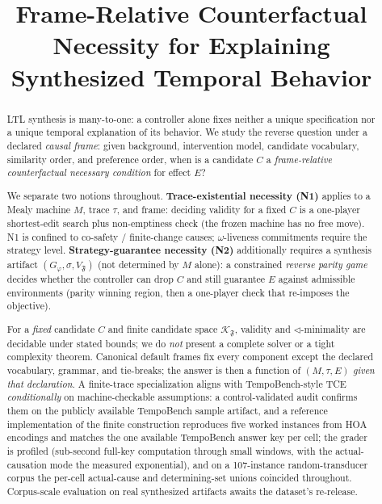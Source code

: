 \documentclass[11pt]{article}
\title{Frame-Relative Counterfactual Necessity for Explaining Synthesized
Temporal Behavior}
\author{}
\date{}
\theoremstyle{remark}
\newcommand{\Frame}{\mathfrak{F}}
\begin{document}
\maketitle

\begin{abstract}
LTL synthesis is many-to-one: a controller alone fixes neither a unique
specification nor a unique temporal explanation of its behavior. We study the
reverse question under a declared \emph{causal frame}: given background,
intervention model, candidate vocabulary, similarity order, and preference order,
when is a candidate \(C\) a \emph{frame-relative counterfactual necessary
condition} for effect \(E\)?

We separate two notions throughout. \textbf{Trace-existential necessity (N1)}
applies to a Mealy machine \(M\), trace \(\tau\), and frame: deciding validity
for a fixed \(C\) is a one-player shortest-edit search plus non-emptiness check
(the frozen machine has no free move). N1 is confined to co-safety / finite-change
causes; \(\omega\)-liveness commitments require the strategy level. \textbf{Strategy-guarantee
necessity (N2)} additionally requires a synthesis artifact \((G_\varphi,\sigma,V_{\Frame})\)
(not determined by \(M\) alone): a constrained \emph{reverse parity game} decides
whether the controller can drop \(C\) and still guarantee \(E\) against admissible
environments (parity winning region, then a one-player check that re-imposes the
objective).

For a \emph{fixed} candidate \(C\) and finite candidate space
\(\mathcal{K}_{\Frame}\), validity and \(\triangleleft\)-minimality are decidable
under stated bounds; we do \emph{not} present a complete solver or a tight
complexity theorem. Canonical default frames fix every component except the
declared vocabulary, grammar, and tie-breaks; the answer is then a function of
\((M,\tau,E)\) \emph{given that declaration}. A finite-trace specialization
aligns with TempoBench-style TCE \emph{conditionally} on machine-checkable
assumptions: a control-validated audit confirms them on the publicly available
TempoBench sample artifact, and a reference implementation of the finite
construction reproduces five worked instances from HOA encodings and matches
the one available TempoBench answer key per cell; the grader is profiled
(sub-second full-key computation through small windows, with the
actual-causation mode the measured exponential), and on a 107-instance
random-transducer corpus the per-cell actual-cause and determining-set unions
coincided throughout. Corpus-scale evaluation on real synthesized artifacts
awaits the dataset's re-release.
\end{abstract}
\end{document}
